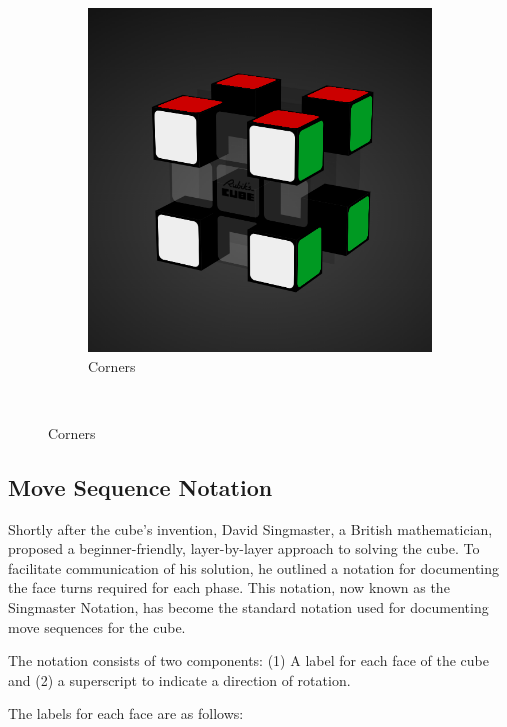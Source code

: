 \begin{figure}[h]
\begin{subfigure}{0.5\textwidth}
    \end{subfigure}%
    \begin{subfigure}{0.5\textwidth}
        \centering
        \caption{Corners}
        \label{fig:anatomy-corners}
        \includegraphics[width=.90\linewidth]{Figures/2 Background/anatomy-corners.png}
    \end{subfigure}\\
\end{figure}
\vfill
\newpage

\subsection{Move Sequence Notation}
\label{subsec:algorithm-notation}

Shortly after the cube's invention, David Singmaster, a British
mathematician, proposed a beginner-friendly, layer-by-layer approach to
solving the cube. To facilitate communication of his solution, he
outlined a notation for documenting the face turns required for each
phase. This notation, now known as the Singmaster Notation, has become
the standard notation used for documenting move sequences for the cube.
\cite{singmaster-notation}

The notation consists of two components: (1) A label for each face of the
cube and (2) a superscript to indicate a direction of rotation.

The labels for each face are as follows:

